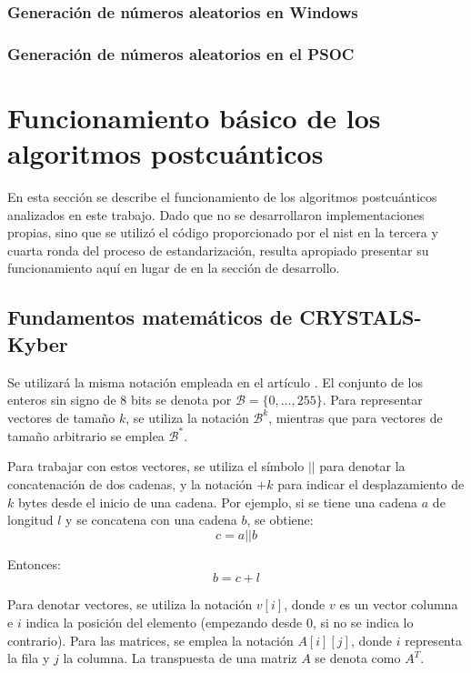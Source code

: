 \subsubsection{Generación de números aleatorios en Windows}
\cite{rngWIN}
\subsubsection{Generación de números aleatorios en el PSOC}
\newpage
\section{Funcionamiento básico de los algoritmos postcuánticos}
En esta sección se describe el funcionamiento de los algoritmos postcuánticos analizados en este trabajo. Dado que no se desarrollaron implementaciones propias, sino que se utilizó el código proporcionado por el \gls{nist} en la tercera \cite{nistPQCround3} y cuarta \cite{nistPQCround4} ronda del proceso de estandarización, resulta apropiado presentar su funcionamiento aquí en lugar de en la sección de desarrollo.
\subsection{Fundamentos matemáticos de CRYSTALS-Kyber }
Se utilizará la misma notación empleada en el artículo \cite{kyber-spec-2021}. El conjunto de los enteros sin signo de 8 bits se denota por \(\mathcal{B} = \{0, \dots, 255\}\). Para representar vectores de tamaño \(k\), se utiliza la notación \(\mathcal{B}^k\), mientras que para vectores de tamaño arbitrario se emplea \(\mathcal{B}^*\).
\newline

Para trabajar con estos vectores, se utiliza el símbolo \(||\) para denotar la concatenación de dos cadenas, y la notación \(+k\) para indicar el desplazamiento de \(k\) bytes desde el inicio de una cadena. Por ejemplo, si se tiene una cadena \(a\) de longitud \(l\) y se concatena con una cadena \(b\), se obtiene:
\begin{equation}
	c = a || b
\end{equation}

Entonces:
\begin{equation}
	b = c + l
\end{equation}

Para denotar vectores, se utiliza la notación \(v[i]\), donde \(v\) es un vector columna e \(i\) indica la posición del elemento (empezando desde 0, si no se indica lo contrario). Para las matrices, se emplea la notación \(A[i][j]\), donde \(i\) representa la fila y \(j\) la columna. La transpuesta de una matriz \(A\) se denota como \(A^T\).
\newline

